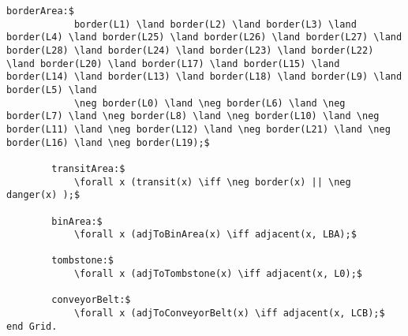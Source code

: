 \begin{lstlisting}[fontadjust, mathescape, frame=single]
        borderArea:$
            border(L1) \land border(L2) \land border(L3) \land border(L4) \land border(L25) \land border(L26) \land border(L27) \land border(L28) \land border(L24) \land border(L23) \land border(L22) \land border(L20) \land border(L17) \land border(L15) \land border(L14) \land border(L13) \land border(L18) \land border(L9) \land border(L5) \land 
            \neg border(L0) \land \neg border(L6) \land \neg border(L7) \land \neg border(L8) \land \neg border(L10) \land \neg border(L11) \land \neg border(L12) \land \neg border(L21) \land \neg border(L16) \land \neg border(L19);$

        transitArea:$
            \forall x (transit(x) \iff \neg border(x) || \neg danger(x) );$

        binArea:$
            \forall x (adjToBinArea(x) \iff adjacent(x, LBA);$

        tombstone:$
            \forall x (adjToTombstone(x) \iff adjacent(x, L0);$

        conveyorBelt:$
            \forall x (adjToConveyorBelt(x) \iff adjacent(x, LCB);$
end Grid.\end{lstlisting}